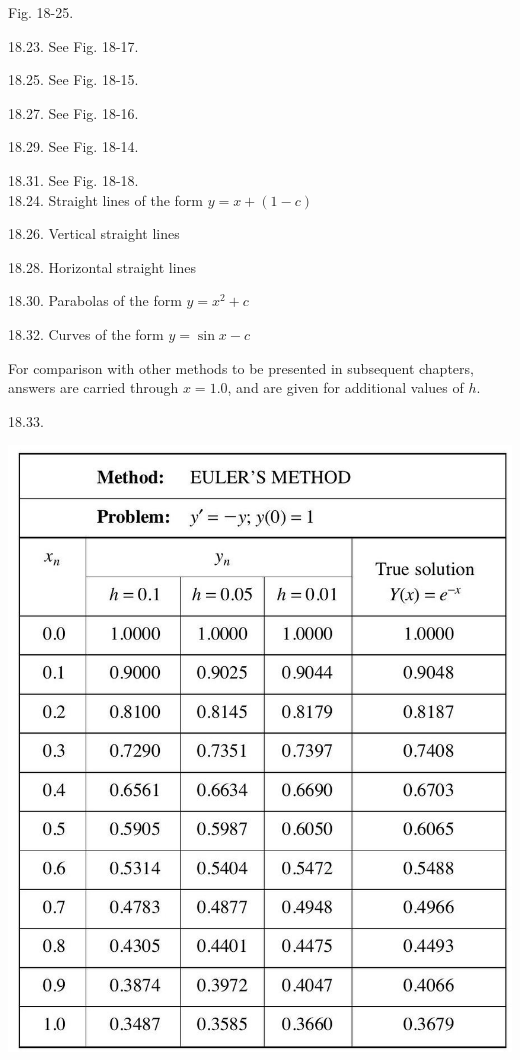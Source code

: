 \documentclass[10pt]{article}
\begin{document}
Fig. 18-25.

18.23. See Fig. 18-17.

18.25. See Fig. 18-15.

18.27. See Fig. 18-16.

18.29. See Fig. 18-14.

18.31. See Fig. 18-18.\\
18.24. Straight lines of the form $y=x+(1-c)$

18.26. Vertical straight lines

18.28. Horizontal straight lines

18.30. Parabolas of the form $y=x^{2}+c$

18.32. Curves of the form $y=\sin x-c$

For comparison with other methods to be presented in subsequent chapters, answers are carried through $x=1.0$, and are given for additional values of $h$.

18.33.

\begin{center}
\includegraphics[max width=\textwidth]{2024_04_03_5bb5b4275a64cb9887d1g-375}
\end{center}
\end{document}
